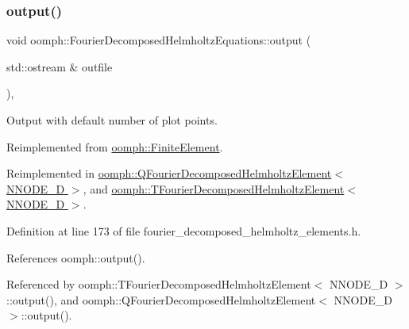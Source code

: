 \subsubsection{\texorpdfstring{output()}{output()}\hspace{0.1cm}{\footnotesize\ttfamily [1/4]}}
{\footnotesize\ttfamily void oomph\+::\+Fourier\+Decomposed\+Helmholtz\+Equations\+::output (\begin{DoxyParamCaption}\item[{std\+::ostream \&}]{outfile }\end{DoxyParamCaption})\hspace{0.3cm}{\ttfamily [inline]}, {\ttfamily [virtual]}}



Output with default number of plot points. 



Reimplemented from \hyperlink{classoomph_1_1FiniteElement_a2ad98a3d2ef4999f1bef62c0ff13f2a7}{oomph\+::\+Finite\+Element}.



Reimplemented in \hyperlink{classoomph_1_1QFourierDecomposedHelmholtzElement_a5182e60d2d855fc2724dabae242157aa}{oomph\+::\+Q\+Fourier\+Decomposed\+Helmholtz\+Element$<$ N\+N\+O\+D\+E\+\_\+D $>$}, and \hyperlink{classoomph_1_1TFourierDecomposedHelmholtzElement_acbbeefc2997cac4a50605f3fe107596b}{oomph\+::\+T\+Fourier\+Decomposed\+Helmholtz\+Element$<$ N\+N\+O\+D\+E\+\_\+D $>$}.



Definition at line 173 of file fourier\+\_\+decomposed\+\_\+helmholtz\+\_\+elements.\+h.



References oomph\+::output().



Referenced by oomph\+::\+T\+Fourier\+Decomposed\+Helmholtz\+Element$<$ N\+N\+O\+D\+E\+\_\+D $>$\+::output(), and oomph\+::\+Q\+Fourier\+Decomposed\+Helmholtz\+Element$<$ N\+N\+O\+D\+E\+\_\+D $>$\+::output().

\mbox{\label{classoomph_1_1FourierDecomposedHelmholtzEquations_a19e2628564b587b97db37c9a4820be60}} 
